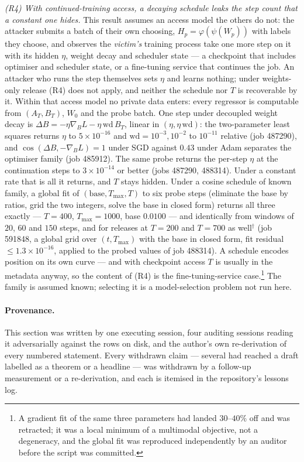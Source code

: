 \emph{(R4) With continued-training access, a decaying schedule leaks the
step count that a constant one hides.} This result assumes an access model
the others do not: the attacker submits a batch of their own choosing,
$H_p=\varphi(\psi(W_p))$ with labels they choose, and observes the
\emph{victim's} training process take one more step on it with its hidden
$\eta$, weight decay and scheduler state — a checkpoint that includes
optimiser and scheduler state, or a fine-tuning service that continues the
job. An attacker who runs the step themselves sets $\eta$ and learns nothing;
under weights-only release (R4) does not apply, and neither the schedule nor
$T$ is recoverable by it. Within that access model no private data enters:
every regressor is computable from $(A_T,B_T)$, $W_0$ and the probe batch.
One step under decoupled weight decay is $\Delta B=-\eta\nabla_BL-\eta\,\mathrm{wd}\,B_T$, linear in
$(\eta,\eta\,\mathrm{wd})$: the two-parameter least squares returns $\eta$ to
$5\times10^{-16}$ and $\mathrm{wd}=10^{-3},10^{-2}$ to $10^{-11}$ relative
(job 487290), and
$\cos(\Delta B,-\nabla_BL)=1$ under SGD against $0.43$ under Adam separates
the optimiser family (job 485912). The same probe returns the per-step $\eta$ at the continuation steps
to $3\times10^{-14}$ or better (jobs 487290, 488314). Under a constant rate that is all it
returns, and $T$ stays hidden. Under a cosine schedule of known family, a
global fit of $(\text{base},T_{\max},T)$ to six probe steps (eliminate the
base by ratios, grid the two integers, solve the base in closed form) returns
all three exactly — $T=400$, $T_{\max}=1000$, base $0.0100$ — and identically
from windows of $20$, $60$ and $150$ steps, and for releases at $T=200$ and
$T=700$ as well$^\dagger$ (job 591848, a global grid over $(t,T_{\max})$
with the base in closed form, fit residual $\le1.3\times10^{-16}$, applied to
the probed values of job 488314). A schedule encodes position on its own
curve — and with checkpoint access $T$ is usually in the metadata anyway, so
the content of (R4) is the fine-tuning-service case.\footnote{A gradient fit
of the same three parameters had landed $30$--$40\%$ off and was retracted;
it was a local minimum of a multimodal objective, not a degeneracy, and the
global fit was reproduced independently by an auditor before the script was
committed.} The family is assumed known;
selecting it is a model-selection problem not run here.

\paragraph{Provenance.} This section was written by one executing session,
four auditing sessions reading it adversarially against the rows on disk,
and the author's own re-derivation of every numbered statement. Every withdrawn claim — several had reached a draft labelled as a
theorem or a headline — was withdrawn by a follow-up measurement or a
re-derivation, and each is itemised in the repository's lessons log.

